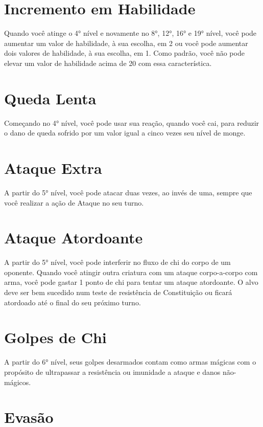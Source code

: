 \begin{multicols}{2}
\section*{Incremento em Habilidade}%
\label{sec:incremento_em_habilidade}

Quando você atinge o 4° nível e novamente no 8°, 12°, 16° e 19° nível, você pode
aumentar um valor de habilidade, à sua escolha, em 2 ou você pode aumentar dois
valores de habilidade, à sua escolha, em 1. Como padrão, você não pode elevar um
valor de habilidade acima de 20 com essa característica.

\section*{Queda Lenta}%
\label{sec:queda_lenta}

Começando no 4° nível, você pode usar sua reação, quando você cai, para reduzir
o dano de queda sofrido por um valor igual a cinco vezes seu nível de monge.

\section*{Ataque Extra}%
\label{sec:ataque_extra}

A partir do 5° nível, você pode atacar duas vezes, ao invés de uma, sempre que
você realizar a ação de Ataque no seu turno.

\section*{Ataque Atordoante}%
\label{sec:ataque_atordoante}

A partir do 5° nível, você pode interferir no fluxo de chi do corpo de um
oponente. Quando você atingir outra criatura com um ataque corpo-a-corpo com
arma, você pode gastar 1 ponto de chi para tentar um ataque atordoante. O alvo
deve ser bem sucedido num teste de resistência de Constituição ou ficará
atordoado até o final do seu próximo turno.

\section*{Golpes de Chi}%
\label{sec:golpes_de_chi}

A partir do 6° nível, seus golpes desarmados contam como armas mágicas com o
propósito de ultrapassar a resistência ou imunidade a ataque e danos
não-mágicos.

\section*{Evasão}%
\label{sec:evasao}


\end{multicols}
